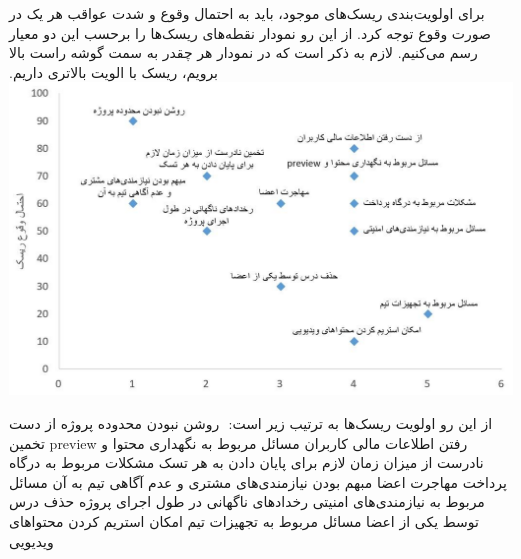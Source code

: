 ‫
‫
‫برای اولویت‌بندی ریسک‌های موجود، باید به احتمال وقوع و شدت عواقب هر یک در صورت وقوع توجه کرد. از این رو نمودار نقطه‌های ریسک‌ها را برحسب این دو معیار رسم می‌کنیم. لازم به ذکر است که در نمودار هر چقدر به سمت گوشه راست بالا برویم، ریسک با الویت بالاتری داریم.
\includegraphics[scale=0.4]{figs/risks_prioritize.jpeg}

‫از این رو اولویت ریسک‌ها به ترتیب زیر است:
‫
‫ روشن نبودن محدوده پروژه 
‫ از دست رفتن اطلاعات مالی کاربران
‫ مسائل مربوط به نگهداری محتوا و preview
‫ تخمین‌ نادرست از میزان زمان لازم برای پایان دادن به هر تسک
‫ مشکلات مربوط به درگاه پرداخت
‫ مهاجرت اعضا
‫ مبهم بودن نیازمندی‌های مشتری و عدم آگاهی تیم به آن
‫ مسائل مربوط به نیازمندی‌های امنیتی
‫ رخدادهای ناگهانی در طول اجرای پروژه
‫ حذف درس توسط یکی از اعضا
‫ مسائل مربوط به تجهیزات تیم
‫ امکان استریم کردن محتواهای ویدیویی
‫
‫